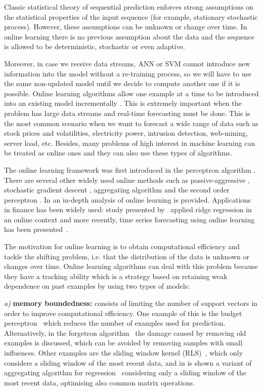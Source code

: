 Classic statistical theory of sequential prediction enforces strong assumptions
on the statistical properties of the input sequence (for example, stationary
stochastic process). However, these assumptions can be unknown or change over
time. In online learning there is no previous assumption about the data and the
sequence is allowed to be deterministic, stochastic or even adaptive.  

Moreover, in case we receive data streams, ANN or SVM cannot introduce new
information into the model without a re-training process, so we will have to use
the same non-updated model until we decide to compute another one if it is
possible.  Online learning algorithms allow one example at a time to be
introduced into an existing model incrementally \cite{vovk2005}. This is
extremely important when the problem has large data streams and real-time
forecasting must be done.  This is the most common scenario when we want to
forecast a wide range of data such as stock prices and volatilities, electricity
power, intrusion detection, web-mining, server load, etc.  Besides, many
problems of high interest in machine learning can be treated as online ones and
they can also use these types of algorithms.

The online learning framework was first introduced in the perceptron algorithm
\cite{rosenblatt58}. There are several other widely used online methods such as
passive-aggressive \cite{crammerETall2006}, stochastic gradient descent
\cite{zhang2004}, aggregating algorithm \cite{vovk2001} and the second order
perceptron \cite{cesa-bianchi2005}.  In \cite{cesa-bianchi2006} an in-depth
analysis of online learning is provided. Applications in finance has been widely used: study presented by~\cite{arce+salinas2012} applied ridge regression in an online context and more recently, time series forecasting using online learning has been presented~\cite{anavaetAl2013}.

The motivation for online learning is to obtain computational efficiency and
tackle the shifting problem, i.e. that the distribution of the data is unknown
or changes over time. Online learning algorithms can deal with this problem
because they have a tracking ability which is a strategy based on retaining weak
dependence on past examples by using two types of models: 

\textit{a)} \textbf{memory boundedness:} consists of limiting the number of
support vectors in order to improve computational efficiency. One example of
this is the budget perceptron~\cite{crammeretal2004} which reduces the number of
examples used for prediction. Alternatively, in the forgetron
algorithm~\cite{dekeletal2008} the damage caused by removing old examples is
discussed, which can be avoided by removing samples with small influences. Other
examples are the sliding window kernel (RLS)~\cite{vanvaerenberghetal2006},
which only considers a sliding window of the most recent data, and in
\cite{arce+salinas2012} is shown a variant of aggregating algorithm for
regression~\cite{vovk2001} considering only a sliding window of the most recent
data, optimising also common matrix operations.

